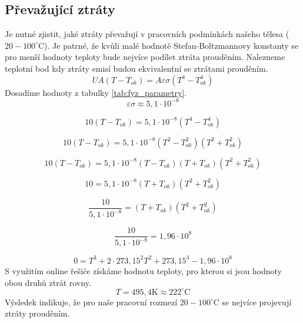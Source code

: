 \documentclass[12pt]{article} %
\begin{document}
\subsection{Převažující ztráty}
Je nutné zjistit, jaké ztráty převažují v pracovních podmínkách našeho tělesa ($20-100 ^\circ \text{C}$). Je patrné, že kvůli malé hodnotě Stefan-Boltzmannovy konstanty se pro menší hodnoty teploty bude nejvíce podílet ztráta prouděním. Nalezneme teplotní bod kdy ztráty emisí budou ekvivalentní se ztrátami prouděním.
\begin{equation*}
    U A (T-T_{ok}) = A \varepsilon \sigma (T^4 - T_{ok}^4)
\end{equation*}
Dosadíme hodnoty z tabulky \ref{tab:fyz_parametry}.
\begin{equation*}
    \varepsilon \sigma \approx 5,1 \cdot 10^{-8}
\end{equation*}

\begin{equation*}
    10 (T-T_{ok}) = 5,1 \cdot 10^{-8} (T^4 - T_{ok}^4)
\end{equation*}

\begin{equation*}
    10 (T-T_{ok}) = 5,1 \cdot 10^{-8} (T^2 - T_{ok}^2) (T^2 + T_{ok}^2)
\end{equation*}

\begin{equation*}
    10 (T-T_{ok}) = 5,1 \cdot 10^{-8} (T - T_{ok}) (T + T_{ok}) (T^2 + T_{ok}^2)
\end{equation*}

\begin{equation*}
    10 = 5,1 \cdot 10^{-8} (T + T_{ok}) (T^2 + T_{ok}^2)
\end{equation*}

\begin{equation*}
    \frac{10}{5,1 \cdot 10^{-8}} = (T + T_{ok}) (T^2 + T_{ok}^2)
\end{equation*}

\begin{equation*}
    \frac{10}{5,1 \cdot 10^{-8}} = 1,96 \cdot 10^{8}
\end{equation*}

\begin{equation*}
    0 = T^3 + 2 \cdot 273,15^2 T^2 + 273,15^3 - 1,96 \cdot 10^8
\end{equation*}
S využitím online řešiče získáme hodnotu teploty, pro kterou si jsou hodnoty obou druhů ztrát rovny.
\begin{equation*}
    T = 495,4 \text{K} \approx 222 ^{\circ}\text{C}
\end{equation*}
Výsledek indikuje, že pro naše pracovní rozmezí $20-100 ^\circ \text{C}$ se nejvíce projevují ztráty prouděním.
\end{document}
